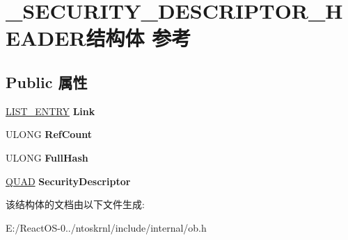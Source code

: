 \hypertarget{struct___s_e_c_u_r_i_t_y___d_e_s_c_r_i_p_t_o_r___h_e_a_d_e_r}{}\section{\+\_\+\+S\+E\+C\+U\+R\+I\+T\+Y\+\_\+\+D\+E\+S\+C\+R\+I\+P\+T\+O\+R\+\_\+\+H\+E\+A\+D\+E\+R结构体 参考}
\label{struct___s_e_c_u_r_i_t_y___d_e_s_c_r_i_p_t_o_r___h_e_a_d_e_r}
\subsection*{Public 属性}
\begin{DoxyCompactItemize}
\item 
\mbox{\label{struct___s_e_c_u_r_i_t_y___d_e_s_c_r_i_p_t_o_r___h_e_a_d_e_r_a52d5cd9665ed8d7489f7b6ad1e75032e}} 
\hyperlink{struct___l_i_s_t___e_n_t_r_y}{L\+I\+S\+T\+\_\+\+E\+N\+T\+RY} {\bfseries Link}
\item 
\mbox{\label{struct___s_e_c_u_r_i_t_y___d_e_s_c_r_i_p_t_o_r___h_e_a_d_e_r_a947a8e28b75bbc03cb387b4ed58a329f}} 
U\+L\+O\+NG {\bfseries Ref\+Count}
\item 
\mbox{\label{struct___s_e_c_u_r_i_t_y___d_e_s_c_r_i_p_t_o_r___h_e_a_d_e_r_a85dfd25c429d757f112ad59f64da1ffb}} 
U\+L\+O\+NG {\bfseries Full\+Hash}
\item 
\mbox{\label{struct___s_e_c_u_r_i_t_y___d_e_s_c_r_i_p_t_o_r___h_e_a_d_e_r_ae10167368a799d4c4f5cd9eb6d41fb96}} 
\hyperlink{struct___q_u_a_d}{Q\+U\+AD} {\bfseries Security\+Descriptor}
\end{DoxyCompactItemize}


该结构体的文档由以下文件生成\+:\begin{DoxyCompactItemize}
\item 
E\+:/\+React\+O\+S-\/0../ntoskrnl/include/internal/ob.\+h\end{DoxyCompactItemize}

